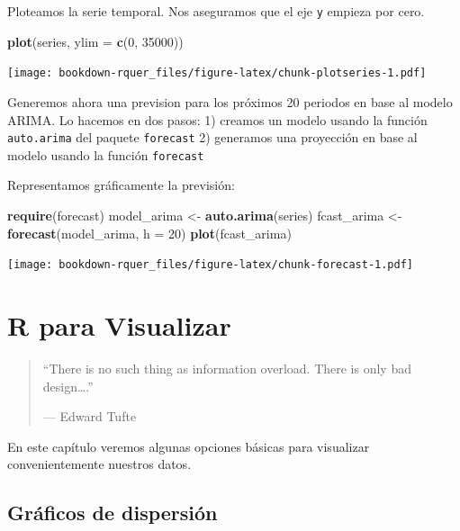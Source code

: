 \documentclass[]{book}
\newenvironment{Shaded}{\begin{snugshade}}{\end{snugshade}}
\newcommand{\DataTypeTok}[1]{\textcolor[rgb]{0.13,0.29,0.53}{#1}}
\newcommand{\DecValTok}[1]{\textcolor[rgb]{0.00,0.00,0.81}{#1}}
\newcommand{\KeywordTok}[1]{\textcolor[rgb]{0.13,0.29,0.53}{\textbf{#1}}}
\newcommand{\NormalTok}[1]{#1}
\newcommand{\StringTok}[1]{\textcolor[rgb]{0.31,0.60,0.02}{#1}}
\theoremstyle{definition}
\theoremstyle{definition}
\theoremstyle{definition}
\theoremstyle{remark}
\begin{document}
Ploteamos la serie temporal. Nos aseguramos que el eje \texttt{y}
empieza por cero.

\begin{Shaded}
\begin{Highlighting}[]
\KeywordTok{plot}\NormalTok{(series, }\DataTypeTok{ylim =} \KeywordTok{c}\NormalTok{(}\DecValTok{0}\NormalTok{, }\DecValTok{35000}\NormalTok{))}
\end{Highlighting}
\end{Shaded}

\texttt{[image: bookdown-rquer\_files/figure-latex/chunk-plotseries-1.pdf]}

Generemos ahora una prevision para los próximos 20 periodos en base al
modelo ARIMA. Lo hacemos en dos pasos: 1) creamos un modelo usando la
función \texttt{auto.arima} del paquete \texttt{forecast} 2) generamos
una proyección en base al modelo usando la función \texttt{forecast}

Representamos gráficamente la previsión:

\begin{Shaded}
\begin{Highlighting}[]
\KeywordTok{require}\NormalTok{(forecast)}
\NormalTok{model_arima <-}\StringTok{ }\KeywordTok{auto.arima}\NormalTok{(series)}
\NormalTok{fcast_arima <-}\StringTok{ }\KeywordTok{forecast}\NormalTok{(model_arima, }\DataTypeTok{h =} \DecValTok{20}\NormalTok{)}
\KeywordTok{plot}\NormalTok{(fcast_arima)}
\end{Highlighting}
\end{Shaded}

\texttt{[image: bookdown-rquer\_files/figure-latex/chunk-forecast-1.pdf]}

\hypertarget{r-para-visualizar}{%
\chapter{R para Visualizar}\label{r-para-visualizar}}

\begin{quote}
``There is no such thing as information overload. There is only bad
design\ldots{}.''

--- Edward Tufte
\end{quote}

En este capítulo veremos algunas opciones básicas para visualizar
convenientemente nuestros datos.

\hypertarget{graficos-de-dispersion}{%
\section{Gráficos de dispersión}\label{graficos-de-dispersion}}
\end{document}
